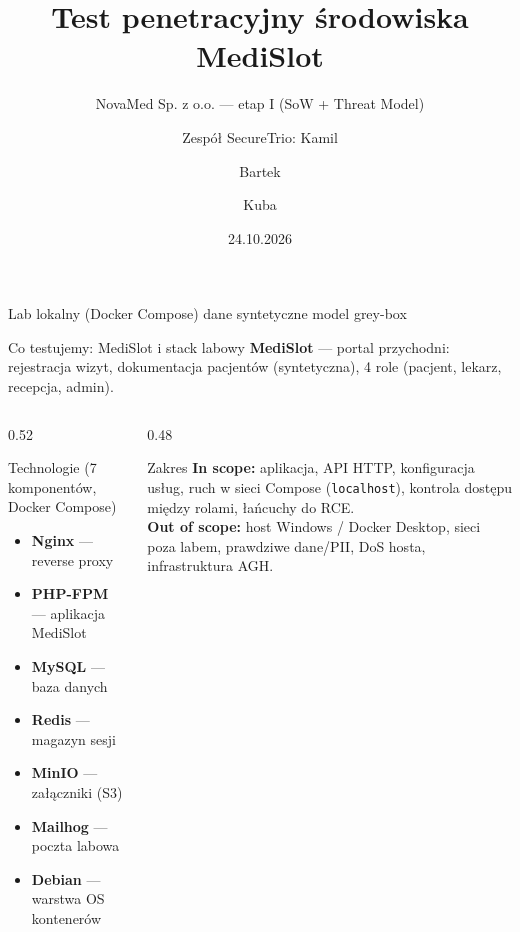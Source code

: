 \documentclass[aspectratio=169,11pt]{beamer}
\title[MediSlot — pentest]{Test penetracyjny środowiska MediSlot}
\subtitle{NovaMed Sp. z o.o. — etap I (SoW + Threat Model)}
\author[SecureTrio]{Zespół SecureTrio: Kamil \and Bartek \and Kuba}
\institute[AGH]{Testy penetracyjne — projekt zaliczeniowy, AGH}
\date{24.10.2026}
\begin{document}
\begin{frame}[plain]
  \titlepage
  \begin{center}
    \footnotesize Lab lokalny (Docker Compose) \textbullet{} dane syntetyczne \textbullet{} model grey-box
  \end{center}
\end{frame}

\begin{frame}{Co testujemy: MediSlot i stack labowy}
  \textbf{MediSlot} — portal przychodni: rejestracja wizyt, dokumentacja pacjentów (syntetyczna), 4 role (pacjent, lekarz, recepcja, admin).

  \begin{columns}[T]
    \begin{column}{0.52\textwidth}
      \begin{block}{Technologie (7 komponentów, Docker Compose)}
        \footnotesize
        \begin{itemize}
          \item \textbf{Nginx} — reverse proxy
          \item \textbf{PHP-FPM} — aplikacja MediSlot
          \item \textbf{MySQL} — baza danych
          \item \textbf{Redis} — magazyn sesji
          \item \textbf{MinIO} — załączniki (S3)
          \item \textbf{Mailhog} — poczta labowa
          \item \textbf{Debian} — warstwa OS kontenerów
        \end{itemize}
      \end{block}
    \end{column}
    \begin{column}{0.48\textwidth}
      \begin{block}{Zakres}
        \footnotesize
        \textbf{In scope:} aplikacja, API HTTP, konfiguracja usług, ruch w sieci Compose (\texttt{localhost}), kontrola dostępu między rolami, łańcuchy do RCE.\\[0.4em]
        \textbf{Out of scope:} host Windows / Docker Desktop, sieci poza labem, prawdziwe dane/PII, DoS hosta, infrastruktura AGH.
      \end{block}
    \end{column}
  \end{columns}
\end{frame}
\end{document}
